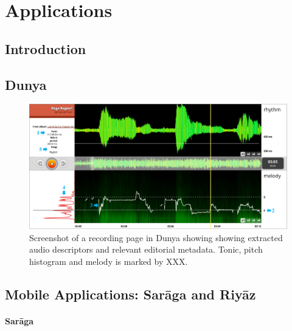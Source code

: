 
\chapter{Applications}
\label{chap:applicatoins}

\section{Introduction}
\label{sec:applications_introduction}

\section{Dunya}
\label{sec:applications_dunya}

\begin{figure}
	\begin{center}
		\includegraphics[width=\figSizeHundred]{ch08_applications/figures/dunyaScreenshot.pdf}
		\end{center}
		\caption{Screenshot of a recording page in Dunya showing showing extracted audio descriptors and relevant editorial metadata. Tonic, pitch histogram and melody is marked by XXX.}
		\label{fig:dunya_recording}
\end{figure}


\section{Mobile Applications: Sar\={a}ga and Riy\={a}z}
\label{sec:mobile_apps_camut}

\subsubsection{Sar\={a}ga}
\label{sec:saraga}



